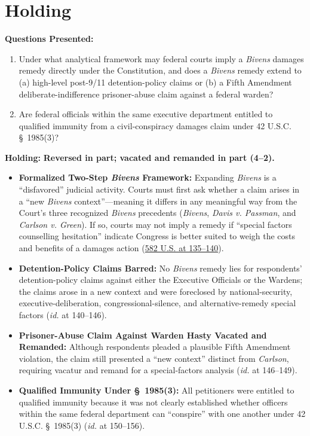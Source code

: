 \documentclass[12pt]{article}
\begin{document}
\section{Holding}
\textbf{Questions Presented:}

\begin{enumerate}
  \item Under what analytical framework may federal courts imply a \textit{Bivens} damages remedy directly under the Constitution, and does a \textit{Bivens} remedy extend to (a) high-level post-9/11 detention-policy claims or (b) a Fifth Amendment deliberate-indifference prisoner-abuse claim against a federal warden?
  \item Are federal officials within the same executive department entitled to qualified immunity from a civil-conspiracy damages claim under 42 U.S.C. \S~1985(3)?
\end{enumerate}

\textbf{Holding:} \textbf{Reversed in part; vacated and remanded in part (4--2).}

\begin{itemize}
  \item \textbf{Formalized Two-Step \textit{Bivens} Framework:} Expanding \textit{Bivens} is a ``disfavored'' judicial activity. Courts must first ask whether a claim arises in a ``new \textit{Bivens} context''---meaning it differs in any meaningful way from the Court's three recognized \textit{Bivens} precedents (\textit{Bivens}, \textit{Davis v. Passman}, and \textit{Carlson v. Green}). If so, courts may not imply a remedy if ``special factors counselling hesitation'' indicate Congress is better suited to weigh the costs and benefits of a damages action (\href{https://www.law.cornell.edu/supremecourt/text/15-1358}{582 U.S. at 135--140}).
  \item \textbf{Detention-Policy Claims Barred:} No \textit{Bivens} remedy lies for respondents' detention-policy claims against either the Executive Officials or the Wardens; the claims arose in a new context and were foreclosed by national-security, executive-deliberation, congressional-silence, and alternative-remedy special factors (\textit{id.} at 140--146).
  \item \textbf{Prisoner-Abuse Claim Against Warden Hasty Vacated and Remanded:} Although respondents pleaded a plausible Fifth Amendment violation, the claim still presented a ``new context'' distinct from \textit{Carlson}, requiring vacatur and remand for a special-factors analysis (\textit{id.} at 146--149).
  \item \textbf{Qualified Immunity Under \S~1985(3):} All petitioners were entitled to qualified immunity because it was not clearly established whether officers within the same federal department can ``conspire'' with one another under 42 U.S.C. \S~1985(3) (\textit{id.} at 150--156).
\end{itemize}
\end{document}
